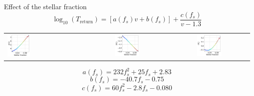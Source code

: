 \documentclass[handout]{beamer}
\begin{document}
\begin{frame}{Effect of the stellar fraction}
	\small
	\begin{equation}\label{eq: fitTr}
	\log_{10}(T_\text{return}) = [a(f_s) v + b(f_s)] + \dfrac{c(f_s)}{v - 1.3}
	\end{equation}
	\begin{table}[h]
		\centering
		\begin{tabular}{lcc}
			\includegraphics[width = 0.3\textwidth]{"../Files/Week 10/a_slides"} & 
			\includegraphics[width = 0.33\textwidth]{"../Files/Week 10/b_slides"} & 
			\includegraphics[width = 0.33\textwidth]{"../Files/Week 10/c_slides"}
		\end{tabular}
	\end{table}
	\small
	\begin{equation}
		a(f_s) = 232f_s^2 + 25 f_s + 2.83
	\end{equation} 
	\begin{equation}
		b(f_s) = -40.7 f_s - 0.75
	\end{equation}
	\begin{equation}
		c(f_s) = 60 f_s^2 - 2.8 f_s - 0.080
	\end{equation}
\end{frame}
\end{document}
